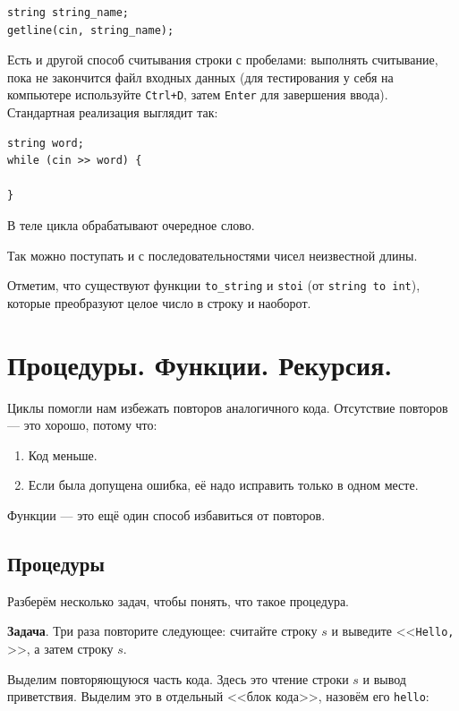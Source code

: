 \documentclass{article}
\newcommand{\task}[1]{\textbf{Задача}. #1}
\begin{document}
	\begin{lstlisting}
string string_name;
getline(cin, string_name);
	\end{lstlisting}
	
	Есть и другой способ считывания строки с пробелами: выполнять считывание, пока не закончится файл входных данных (для тестирования у себя на компьютере используйте \texttt{Ctrl+D}, затем \texttt{Enter} для завершения ввода). Стандартная реализация выглядит так:
	
	\begin{lstlisting}
string word;
while (cin >> word) {
	
}
	\end{lstlisting}
	
	В теле цикла обрабатывают очередное слово.
	
	Так можно поступать и с последовательностями чисел неизвестной длины.
	
	Отметим, что существуют функции \texttt{to\_string} и \texttt{stoi} (от \texttt{string to int}), которые преобразуют целое число в строку и наоборот.

	\section{Процедуры. Функции. Рекурсия.}

	Циклы помогли нам избежать повторов аналогичного кода. Отсутствие повторов --- это хорошо, потому что:
	
	\begin{enumerate}
		\item {Код меньше.}
		\item {Если была допущена ошибка, её надо исправить только в одном месте.}
	\end{enumerate}
	
	Функции --- это ещё один способ избавиться от повторов.
	
	\subsection{Процедуры}
	
	Разберём несколько задач, чтобы понять, что такое процедура.
	
	\task{Три раза повторите следующее: считайте строку $s$ и выведите <<\texttt{Hello, }>>, а затем строку $s$.}
	
	Выделим повторяющуюся часть кода. Здесь это чтение строки $s$ и вывод приветствия. Выделим это в отдельный <<блок кода>>, назовём его \texttt{hello}:
	
\end{document}
